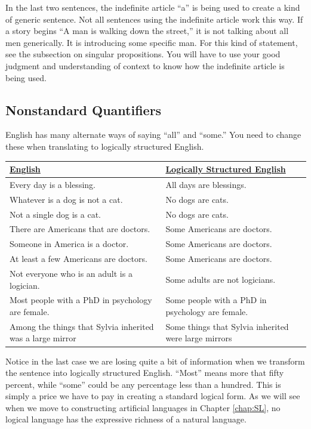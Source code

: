 In the last two sentences, the indefinite article ``a'' is being used to create a kind of generic sentence. Not all sentences using the indefinite article work this way. If a story begins ``A man is walking down the street,'' it is not talking about all men generically. It is introducing some specific man. For this kind of  statement, see the subsection on singular propositions. You will have to use your good judgment and understanding of context to know how the indefinite article is being used.

\subsection{Nonstandard Quantifiers}
\label{subsec:nonstandard_quantifiers}
English has many alternate ways of saying ``all'' and ``some.'' You need to change these when translating to logically structured English. 

\begin{longtabu}{p{.5\linewidth}p{.5\linewidth}}
\underline{English} &
\underline{Logically Structured English} \\
\endhead 
Every day is a blessing. &
All days are blessings. \\

Whatever is a dog is not a cat. &
No dogs are cats. \\

Not a single dog is a cat. &
No dogs are cats. \\

There are Americans that are doctors. &
Some Americans are doctors. \\

Someone in America is a doctor. &
Some Americans are doctors. \\

At least a few Americans are doctors.&
Some Americans are doctors. \\

Not everyone who is an adult is a logician. &
Some adults are not logicians. \\

Most people with a PhD in psychology are female. &
Some people with a PhD in psychology are female. \\

Among the things that Sylvia inherited was a large mirror &
Some things that Sylvia inherited were large mirrors
\end{longtabu}

Notice in the last case we are losing quite a bit of information when we transform the sentence into logically structured English. ``Most'' means more that fifty percent, while ``some'' could be any percentage less than a hundred. This is simply a price we have to pay in creating a standard logical form. As we will see when we move to constructing artificial languages in Chapter \ref{chap:SL}, no logical language has the expressive richness of a natural language. 

